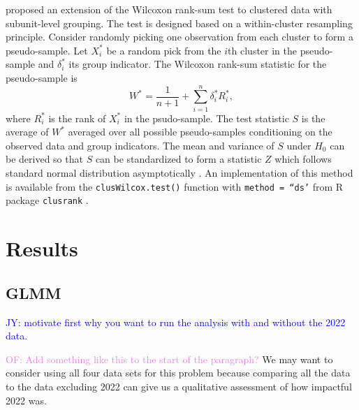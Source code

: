 \documentclass[12pt, letterpaper, titlepage]{article}
\newcommand{\jy}[1]{\textcolor{blue}{JY: #1}}
\newcommand{\of}[1]{\textcolor{violet}{OF: #1}}
\begin{document}
\citet{datta2005rank} proposed an extension of the Wilcoxon rank-sum test to
clustered data with subunit-level grouping. The test is designed based on a
within-cluster resampling principle. Consider randomly picking one observation
from each cluster to form a pseudo-sample. Let $X_i^*$ be a random pick from the
$i$th cluster in the pseudo-sample and $\delta_i^*$ its group indicator. The
Wilcoxon rank-sum statistic for the pseudo-sample is
\[
W^* = \frac{1}{n + 1} + \sum_{i=1}^{n} \delta_{i}^{*} R_{i}^{*},
\]
where $R_{i}^{*}$ is the rank of $X_{i}^{*}$ in the psudo-sample.
The test statistic $S$ is the average of $W^*$ averaged over all possible
pseudo-samples conditioning on the observed data and group indicators.
The mean and variance of $S$ under $H_0$ can be derived so that $S$ can be
standardized to form a statistic $Z$ which follows standard normal distribution
asymptotically \citep[p.910]{datta2005rank}. An implementation of this method is
available from the \texttt{clusWilcox.test()} function with
\texttt{method = ``ds'} from R package \texttt{clusrank}
\citep{jiang2017wilcoxon}.


\section{Results} \label{sec:Results}

\subsection{GLMM} \label{subsec:Results_GLMM}

\jy{motivate first why you want to run the analysis with and without the 2022 data.}

\of{Add something like this to the start of the paragraph?}
We may want to consider using all four data sets for this problem because
comparing all the data to the data excluding 2022 can give us a qualitative
assessment of how impactful 2022 was.
\end{document}
